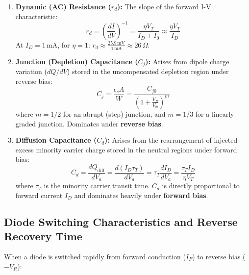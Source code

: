 \documentclass[12pt,a4paper]{article}
\begin{document}
\begin{enumerate}[label=\arabic*., leftmargin=*]
  \item \textbf{Dynamic (AC) Resistance ($r_d$):} The slope of the forward I-V characteristic:
  \begin{equation}
    r_d = \left(\frac{dI}{dV}\right)^{-1} = \frac{\eta V_T}{I_D + I_0} \approx \frac{\eta V_T}{I_D}
  \end{equation}
  At $I_D = 1\,\text{mA}$, for $\eta = 1$: $r_d \approx \frac{25.9\,\text{mV}}{1\,\text{mA}} \approx 26\,\Omega$.

  \item \textbf{Junction (Depletion) Capacitance ($C_j$):} Arises from dipole charge variation ($dQ/dV$) stored in the uncompensated depletion region under reverse bias:
  \begin{equation}
    C_j = \frac{\epsilon_s A}{W} = \frac{C_{j0}}{\left(1 + \displaystyle\frac{V_R}{V_{bi}}\right)^m}
  \end{equation}
  where $m = 1/2$ for an abrupt (step) junction, and $m = 1/3$ for a linearly graded junction. Dominates under \textbf{reverse bias}.

  \item \textbf{Diffusion Capacitance ($C_d$):} Arises from the rearrangement of injected excess minority carrier charge stored in the neutral regions under forward bias:
  \begin{equation}
    C_d = \frac{d Q_{\text{diff}}}{d V_a} = \frac{d (I_D \tau_T)}{d V_a} = \tau_T \frac{d I_D}{d V_a} = \frac{\tau_T I_D}{\eta V_T}
  \end{equation}
  where $\tau_T$ is the minority carrier transit time. $C_d$ is directly proportional to forward current $I_D$ and dominates heavily under \textbf{forward bias}.
\end{enumerate}

\subsection{Diode Switching Characteristics and Reverse Recovery Time}
When a diode is switched rapidly from forward conduction ($I_F$) to reverse bias ($-V_R$):
\end{document}
